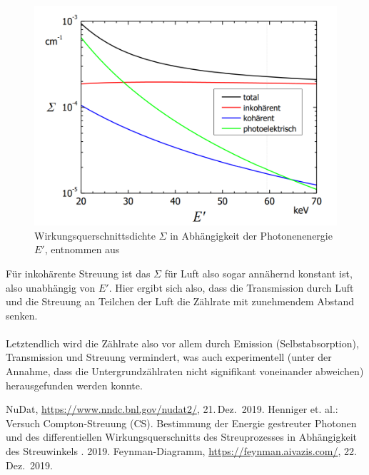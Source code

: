 \documentclass[german,  %
parskip=full,  %
]{scrartcl}
\begin{document}
\begin{figure}[h!]\centering
\includegraphics[scale=0.4]{sigma_luft}
\caption{Wirkungsquerschnittsdichte $\Sigma$ in Abhängigkeit der Photonenenergie $E'$, entnommen aus \cite{Anleitung}}
\end{figure}
Für inkohärente Streuung ist das $\Sigma$ für Luft also sogar annähernd konstant ist, also unabhängig von $E'$.
Hier ergibt sich also, dass die Transmission durch Luft und die Streuung an Teilchen der Luft die Zählrate mit zunehmendem Abstand senken.
\\\\
Letztendlich wird die Zählrate also vor allem durch Emission (Selbstabsorption), Transmission und Streuung vermindert, was auch experimentell (unter der Annahme, dass die Untergrundzählraten nicht signifikant voneinander abweichen) herausgefunden werden konnte. 




    \begin{thebibliography}{9}
    NuDat,
    \url{https://www.nndc.bnl.gov/nudat2/},
    21.\,Dez.~2019.
    Henniger et. al.: Versuch Compton-Streuung (CS). Bestimmung der Energie gestreuter Photonen und des differentiellen Wirkungsquerschnitts des Streuprozesses in Abhängigkeit des Streuwinkels . 2019.
    Feynman-Diagramm,
    \url{https://feynman.aivazis.com/},
    22.\,Dez.~2019.
\end{thebibliography}
\end{document}
